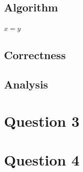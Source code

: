 \documentclass{article}
\begin{document}
    \subsection*{Algorithm}
        \begin{algorithm}[H]
            \begin{algorithmic}
                    \State $x = y$
                \EndProcedure
            \end{algorithmic}
        \end{algorithm}

    \subsection*{Correctness}

    \subsection*{Analysis}

    \section*{Question 3}

    \section*{Question 4}
\end{document}
